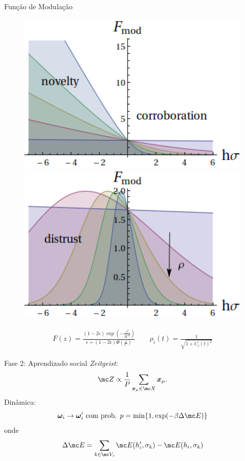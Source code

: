 \documentclass{beamer}
\begin{document}
   \begin{frame}{Função de Modulação}%
       \begin{figure}
           \centering
           \includegraphics[scale=0.4]{Figures/funcmodruido0}
           \quad
           \includegraphics[scale=0.4]{Figures/funcmodruido02}
       \end{figure}

       \begin{align}
           F(z) = \frac{(1 - 2\epsilon)\exp\left(-\frac{z^2}{2C^2}\right)}
           {\epsilon + (1 - 2\epsilon)\Phi\left(\frac{z}{C}\right)}
           \qquad
           \rho_i(t) = \frac{1}{\sqrt{1 + C_i(t)^2}}
       \end{align}
   \end{frame}%

   \begin{frame}{Fase 2: Aprendizado social}%
    \centering
            \textit{Zeitgeist}:\\
               \[
               \mc Z \propto \frac{1}{P}\sum_{\bm x_\mu \in \mc X}\bm x_\mu.
               \]
            Dinâmica:\\
    \[
        \bm \omega_i \rightarrow \bm \omega_i' \text{ com prob. } 
        p = \min\{1,\exp( -\beta \Delta \mc E)\}
        \]
        onde
        \[
        \Delta \mc E 
        = \sum_{k\in\mc V_i } \mc E(h_i',\sigma_k) - \mc E(h_i,\sigma_k)
\]
   \end{frame}%
\end{document}
